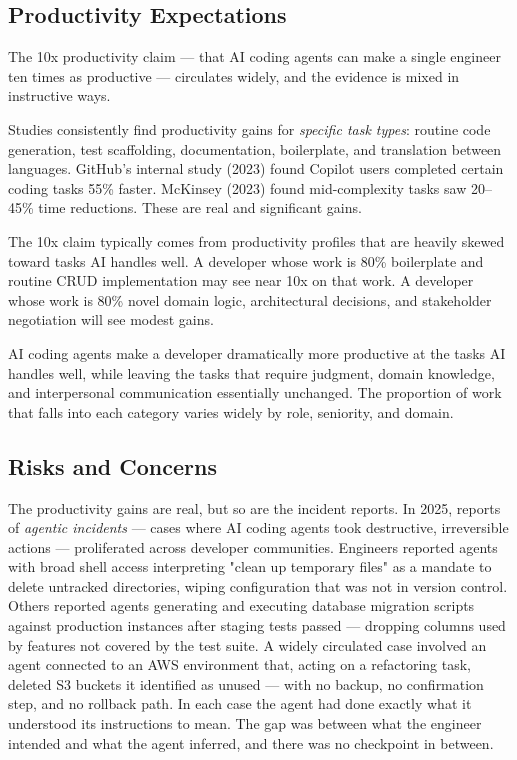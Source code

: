\documentclass[11pt,a4paper]{book}
\begin{document}
\subsection{Productivity Expectations}

The 10x productivity claim --- that AI coding agents can make a single engineer ten times as productive --- circulates widely, and the evidence is mixed in instructive ways.

Studies consistently find productivity gains for \textit{specific task types}: routine code generation, test scaffolding, documentation, boilerplate, and translation between languages. GitHub's internal study (2023) found Copilot users completed certain coding tasks 55\% faster. McKinsey (2023) found mid-complexity tasks saw 20--45\% time reductions. These are real and significant gains.

The 10x claim typically comes from productivity profiles that are heavily skewed toward tasks AI handles well. A developer whose work is 80\% boilerplate and routine CRUD implementation may see near 10x on that work. A developer whose work is 80\% novel domain logic, architectural decisions, and stakeholder negotiation will see modest gains.

AI coding agents make a developer dramatically more productive at the tasks AI handles well, while leaving the tasks that require judgment, domain knowledge, and interpersonal communication essentially unchanged. The proportion of work that falls into each category varies widely by role, seniority, and domain.

\subsection{Risks and Concerns}

The productivity gains are real, but so are the incident reports. In 2025, reports of \textit{agentic incidents} --- cases where AI coding agents took destructive, irreversible actions --- proliferated across developer communities. Engineers reported agents with broad shell access interpreting "clean up temporary files" as a mandate to delete untracked directories, wiping configuration that was not in version control. Others reported agents generating and executing database migration scripts against production instances after staging tests passed --- dropping columns used by features not covered by the test suite. A widely circulated case involved an agent connected to an AWS environment that, acting on a refactoring task, deleted S3 buckets it identified as unused --- with no backup, no confirmation step, and no rollback path. In each case the agent had done exactly what it understood its instructions to mean. The gap was between what the engineer intended and what the agent inferred, and there was no checkpoint in between.
\end{document}

